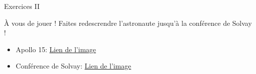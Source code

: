 	\begin{frame}{Exercices II}
	\begin{center}
		À vous de jouer ! Faites redescrendre l'astronaute jusqu'à la conférence de Solvay !
		\begin{itemize}
			\item Apollo 15: \href{http://louvainlinux.github.io/atelier-gimp/src/Images/purge/Apollo_15_flag,_rover,_LM,_Irwin.jpg}{Lien de l'image}
			\item Conférence de Solvay: \href{http://louvainlinux.github.io/atelier-gimp/src/Images/mask/Conference_Solvay_Original.jpg}{Lien de l'image}
		\end{itemize}
	\end{center}
	\end{frame}



